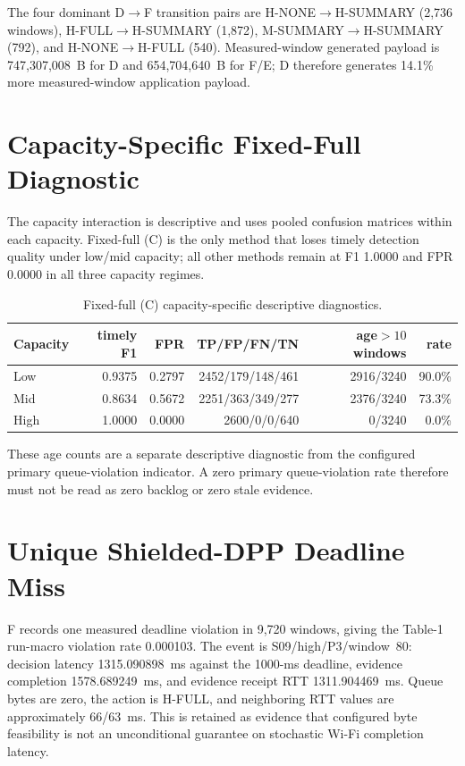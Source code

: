 \documentclass[10pt]{article}
\begin{document}
The four dominant D$\rightarrow$F transition pairs are H-NONE$\rightarrow$H-SUMMARY (2,736 windows), H-FULL$\rightarrow$H-SUMMARY (1,872), M-SUMMARY$\rightarrow$H-SUMMARY (792), and H-NONE$\rightarrow$H-FULL (540). Measured-window generated payload is 747,307,008~B for D and 654,704,640~B for F/E; D therefore generates 14.1\% more measured-window application payload.

\section{Capacity-Specific Fixed-Full Diagnostic}
The capacity interaction is descriptive and uses pooled confusion matrices within each capacity. Fixed-full (C) is the only method that loses timely detection quality under low/mid capacity; all other methods remain at F1 1.0000 and FPR 0.0000 in all three capacity regimes.

\begin{table}[h]
\centering
\caption{Fixed-full (C) capacity-specific descriptive diagnostics.}
\begin{tabular}{@{}lrrrrr@{}}
\toprule
Capacity & timely F1 & FPR & TP/FP/FN/TN & age$>10$ windows & rate\\
\midrule
Low  & 0.9375 & 0.2797 & 2452/179/148/461 & 2916/3240 & 90.0\%\\
Mid  & 0.8634 & 0.5672 & 2251/363/349/277 & 2376/3240 & 73.3\%\\
High & 1.0000 & 0.0000 & 2600/0/0/640     & 0/3240    & 0.0\%\\
\bottomrule
\end{tabular}
\end{table}

These age counts are a separate descriptive diagnostic from the configured primary queue-violation indicator. A zero primary queue-violation rate therefore must not be read as zero backlog or zero stale evidence.

\section{Unique Shielded-DPP Deadline Miss}
F records one measured deadline violation in 9,720 windows, giving the Table-1 run-macro violation rate 0.000103. The event is S09/high/P3/window~80: decision latency 1315.090898~ms against the 1000-ms deadline, evidence completion 1578.689249~ms, and evidence receipt RTT 1311.904469~ms. Queue bytes are zero, the action is H-FULL, and neighboring RTT values are approximately 66/63~ms. This is retained as evidence that configured byte feasibility is not an unconditional guarantee on stochastic Wi-Fi completion latency.
\end{document}
